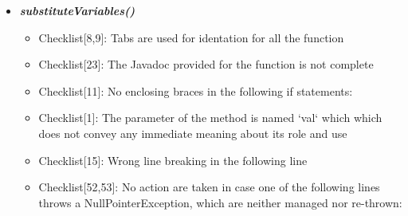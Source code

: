 \documentclass[11pt,titlepage]{article} %
\begin{document}
  \begin{itemize}
   \item \textbf{\textit{substituteVariables()}}
   \begin{itemize}
    \item Checklist[8,9]: Tabs are used for identation for all the function
    \item Checklist[23]: The Javadoc provided for the function is not complete 
    \item Checklist[11]: No enclosing braces in the following if statements:
      
      
      
      
      
    \item Checklist[1]: The parameter of the method is named `val` which  which does not convey any immediate meaning about its role and use
    
    \item Checklist[15]: Wrong line breaking in the following line
      

    \item Checklist[52,53]: No action are taken in case one of the following lines throws a NullPointerException,  which are neither managed nor re-thrown:
      
      
      
      
      

\end{itemize}
\end{itemize}
\end{document}
